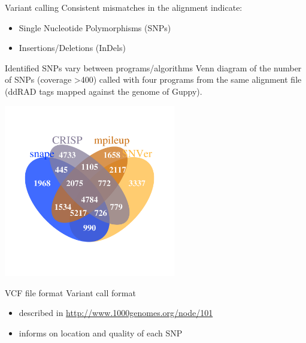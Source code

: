 \documentclass[presentation]{beamer}
\begin{document}
\begin{frame}[label=sec-3-1-13]{Variant calling}
Consistent mismatches in the alignment indicate:
\begin{itemize}
\item Single Nucleotide Polymorphisms (SNPs)
\item Insertions/Deletions (InDels)
\end{itemize}
\end{frame}

\begin{frame}[label=sec-3-1-14]{Identified SNPs vary between programs/algorithms}
Venn diagram of the number of SNPs (coverage >400) called with four programs from the same alignment file (ddRAD tags mapped against the genome of Guppy).

\begin{center}
\includegraphics[width=7.5cm]{20150204_SNPs400DP.png}

\end{center}
\end{frame}
\begin{frame}[label=sec-3-1-15]{VCF file format}
Variant call format
\begin{itemize}
\item described in \url{http://www.1000genomes.org/node/101}
\item informs on location and quality of each SNP
\end{itemize}
\end{frame}
\end{document}
